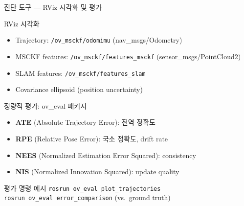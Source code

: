 \begin{frame}[shrink=10]{진단 도구 --- RViz 시각화 및 평가}
  \begin{block}{RViz 시각화}
    \begin{itemize}
      \item Trajectory: \texttt{/ov\_msckf/odomimu} (nav\_msgs/Odometry)
      \item MSCKF features: \texttt{/ov\_msckf/features\_msckf} (sensor\_msgs/PointCloud2)
      \item SLAM features: \texttt{/ov\_msckf/features\_slam}
      \item Covariance ellipsoid (position uncertainty)
    \end{itemize}
  \end{block}
  \begin{block}{정량적 평가: ov\_eval 패키지}
    \begin{itemize}
      \item \textbf{ATE} (Absolute Trajectory Error): 전역 정확도
      \item \textbf{RPE} (Relative Pose Error): 국소 정확도, drift rate
      \item \textbf{NEES} (Normalized Estimation Error Squared): consistency
      \item \textbf{NIS} (Normalized Innovation Squared): update quality
    \end{itemize}
  \end{block}
  \begin{exampleblock}{평가 명령 예시}
    \texttt{rosrun ov\_eval plot\_trajectories} \\
    \texttt{rosrun ov\_eval error\_comparison} (vs.\ ground truth)
  \end{exampleblock}
\end{frame}


